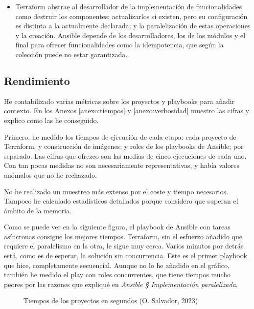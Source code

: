 \documentclass[11pt]{article}
\begin{document}
\begin{flushleft}
\begin{itemize}
            \item Terraform abstrae al desarrollador de la implementación de funcionalidades como destruir los componentes; actualizarlos si existen, pero su configuración es distinta a la actualmente declarada; y la paralelización de estas operaciones y la creación. Ansible depende de los desarrolladores, los de los módulos y el final para ofrecer funcionalidades como la idempotencia, que según la colección puede no estar garantizada. 
            \linebreak            
		\end{itemize}

\bigskip
\bigskip
\subsection{Rendimiento}
He contabilizado varias métricas sobre los proyectos y playbooks para añadir contexto. En los Anexos \ref{anexo:tiempos} y \ref{anexo:verbosidad} muestro las cifras y explico como las he conseguido. 
\linebreak

Primero, he medido los tiempos de ejecución de cada etapa: cada proyecto de Terraform, y construcción de imágenes; y roles de los playbooks de Ansible; por separado. Las cifras que ofrezco son las medias de cinco ejecuciones de cada uno. Con tan pocas medidas no son necesariamente representativas, y había valores anómalos que no he rechazado. 
\linebreak

No he realizado un muestreo más extenso por el coste y tiempo necesarios. Tampoco he calculado estadísticos detallados porque considero que superan el ámbito de la memoria.
\linebreak

Como se puede ver en la siguiente figura, el playbook de Ansible con tareas asíncronas consigue los mejores tiempos. Terraform, sin el esfuerzo añadido que requiere el paralelismo en la otra, le sigue muy cerca. Varios minutos por detrás está, como es de esperar, la solución sin concurrencia. Este es el primer playbook que hice, completamente secuencial. Aunque no lo he añadido en el gráfico, también he medido el play con roles concurrentes, que tiene tiempos mucho peores por las razones que expliqué en \textit{Ansible § Implementación paralelizada}.
\linerbeak

    \begin{figure}[htb]
        \centering
        \caption{Tiempos de los proyectos en segundos (O. Salvador, 2023)}
    \end{figure}


\end{flushleft}
\end{document}
